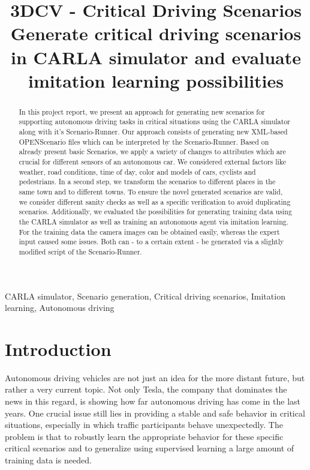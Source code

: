 \documentclass[conference, a4paper, 11pt]{IEEEtran}
\begin{document}
\title{3DCV - Critical Driving Scenarios\\
{\small Generate critical driving scenarios in CARLA simulator and evaluate imitation learning possibilities}
}

\author{
    \and
    \and
    \and
}

\maketitle

\begin{abstract}
	In this project report, we present an approach for generating new scenarios for supporting autonomous driving tasks in critical situations using the CARLA simulator along with it's Scenario-Runner. Our approach consists of generating new XML-based OPENScenario files which can be interpreted by the Scenario-Runner. Based on already present basic Scenarios, we apply a variety  of changes to attributes which are crucial for different sensors of an autonomous car. We considered external factors like weather, road conditions, time of day, color and models of cars, cyclists and pedestrians. In a second step, we transform the scenarios to different places in the same town and to different towns. To ensure the novel generated scenarios are valid, we consider different sanity checks as well as a specific verification to avoid duplicating scenarios.
	Additionally, we evaluated the possibilities for generating training data using the CARLA simulator as well as training an autonomous agent via imitation learning. For the training data the camera images can be obtained easily, whereas the expert input caused some issues. Both can - to a certain extent - be generated via a slightly modified script of the Scenario-Runner.

\end{abstract}

\begin{IEEEkeywords}
CARLA simulator, Scenario generation, Critical driving scenarios, Imitation learning, Autonomous driving
\end{IEEEkeywords}

\section{Introduction}
Autonomous driving vehicles are not just an idea for the more distant future, but rather a very current topic.
Not only Tesla, the company that dominates the news in this regard, is showing how far autonomous driving has come in the last years.
One crucial issue still lies in providing a stable and safe behavior in critical situations, especially in which traffic participants behave unexpectedly. 
The problem is that to robustly learn the appropriate behavior for these specific critical scenarios and to generalize using supervised learning a large amount of training data is needed.
\end{document}
